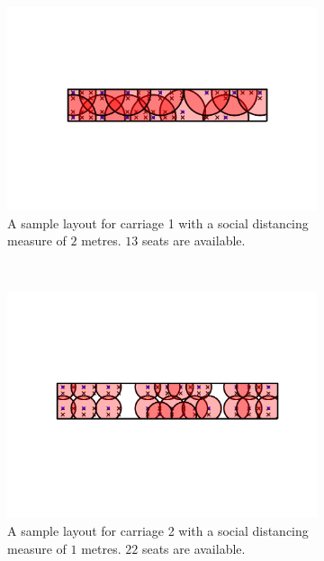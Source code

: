 \documentclass[11pt,a4paper]{article}
\begin{document}
\begin{itemize}
\begin{figure}[ht!]
\begin{subfigure}[h]{0.490\linewidth}
\includegraphics[width = \linewidth]{class150_first_car_2m.png}
\caption{A sample layout for carriage 1 with a social distancing measure of $2$ metres. $13$ seats are available.}
\label{TwoMetre1}
\end{subfigure}
~
\begin{subfigure}[h]{0.49\linewidth}
\centering
\includegraphics[width = \linewidth]{class150_second_car_1m.png}
\caption{A sample layout for carriage 2 with a social distancing measure of $1$ metres. $22$ seats are available.}
\label{OneMetre2}
\end{subfigure}
~
\begin{subfigure}[h]{0.490\linewidth}
\centering

\end{subfigure}
\end{figure}
\end{itemize}
\end{document}
